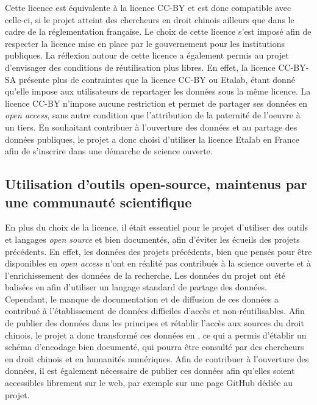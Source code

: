 Cette licence est équivalente à la licence CC-BY et est donc compatible avec celle-ci, si le projet \COREL atteint des chercheurs en droit chinois ailleurs que dans le cadre de la réglementation française. Le choix de cette licence s'est imposé afin de respecter la licence mise en place par le gouvernement pour les institutions publiques. La réflexion autour de cette licence a également permis au projet d'envisager des conditions de réutilisation plus libres. En effet, la licence CC-BY-SA présente plus de contraintes que la licence CC-BY ou Etalab, étant donné qu'elle impose aux utilisateurs de repartager les données sous la même licence. La licence CC-BY n'impose aucune restriction et permet de partager ses données en \textit{open access}, sans autre condition que l'attribution de la paternité de l'oeuvre à un tiers. En souhaitant contribuer à l'ouverture des données et au partage des données publiques, le projet \COREL a donc choisi d'utiliser la licence Etalab en France afin de s'inscrire dans une démarche de science ouverte. 

\subsection{Utilisation d’outils open-source, maintenus par une communauté scientifique}

En plus du choix de la licence, il était essentiel pour le projet d'utiliser des outils et langages \textit{open source} et bien documentés, afin d'éviter les écueils des projets précédents. En effet, les données des projets précédents, bien que pensés pour être disponibles en \textit{open access} n'ont en réalité pas contribués à la science ouverte et à l'enrichissement des données de la recherche. Les données du projet \LSC ont été balisées en \XML afin d'utiliser un langage standard de partage des données. Cependant, le manque de documentation et de diffusion de ces données a contribué à l'établissement de données difficiles d'accès et non-réutilisables. Afin de publier des données dans les principes \fair et rétablir l'accès aux sources du droit chinois, le projet \COREL a donc transformé ces données en \TEI, ce qui a permis d'établir un schéma d'encodage bien documenté, qui pourra être consulté par des chercheurs en droit chinois et en humanités numériques. Afin de contribuer à l'ouverture des données, il est également nécessaire de publier ces données afin qu'elles soient accessibles librement sur le web, par exemple sur une page GitHub dédiée au projet.

